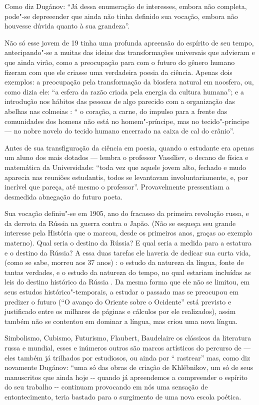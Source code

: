Como diz Dugánov: ``Já dessa enumeração de interesses, embora não
completa, pode"-se depreeender que  ainda não tinha definido sua
vocação, embora não houvesse dúvida quanto à sua grandeza''.

Não só esse jovem de 19 tinha uma profunda apreensão do espírito de seu
tempo, antecipando"-se a muitas das ideias das transformações universais
que advieram e que ainda virão, como a preocupação para com o futuro do
gênero humano fizeram com que ele criasse uma verdadeira poesia da
ciência. Apenas dois exemplos: a preocupação pela transformação da
biosfera natural em noosfera, ou, como dizia ele: ``a esfera da razão
criada pela energia da cultura humana''; e a introdução nos hábitos das
pessoas de algo parecido com a organização das abelhas nas colmeias : ``
o coração, a carne, do impulso para a frente das comunidades dos homens
não está no homem"-príncipe, mas no tecido"-príncipe --- no nobre novelo do
tecido humano encerrado na caixa de cal do crânio''.

Antes de sua transfiguração da ciência em poesia, quando o estudante 
era apenas um aluno dos mais dotados --- lembra o professor Vassíliev, o
decano de física e matemática da Universidade: ``toda vez que aquele
jovem alto, fechado e mudo aparecia nas reuniões estudantis, todos se
levantavam involuntariamente, e, por incrível que pareça, até mesmo o
professor''. Provavelmente pressentiam a desmedida abnegação do futuro
poeta.

Sua vocação definiu"-se em 1905, ano do fracasso da primeira revolução
russa, e da derrota da Rússia na guerra contra o Japão. (Não se esqueça
seu grande interesse pela História que o marcou, desde os primeiros
anos, graças ao exemplo materno). Qual seria o destino da Rússia? E qual
seria a medida para a estatura e o destino da Rússia? A essa duas
tarefas ele haveria de dedicar sua curta vida, (como se sabe, morreu aos
37 anos) : o estudo da natureza da língua, fonte de tantas verdades, e o
estudo da natureza do tempo, no qual estariam incluídas as leis do
destino histórico da Rússia . Da mesma forma que ele não se limitou, em
seus estudos histórico"-temporais, a estudar o passado mas se preocupou
em predizer o futuro (``O avanço do Oriente sobre o Ocidente'' está
previsto e justificado entre os milhares de páginas e cálculos por ele
realizados), assim também não se contentou em dominar a língua, mas
criou uma nova língua.

Simbolismo, Cubismo, Futurismo, Flaubert, Baudelaire os clássicos da
literatura russa e mundial, esses e inúmeros outros são marcos
artísticos do percurso de  --- eles também já trilhados por estudiosos,
ou ainda por `` rastrear'' mas, como diz novamente Dugánov: ``uma só das
obras de criação de Khlébnikov, um só de seus manuscritos que ainda hoje
-\/- quando já apreendemos a compreender o espírito do seu trabalho -\/-
continuam provocando em nós uma sensação de entontecimento, teria
bastado para o surgimento de uma nova escola poética.

